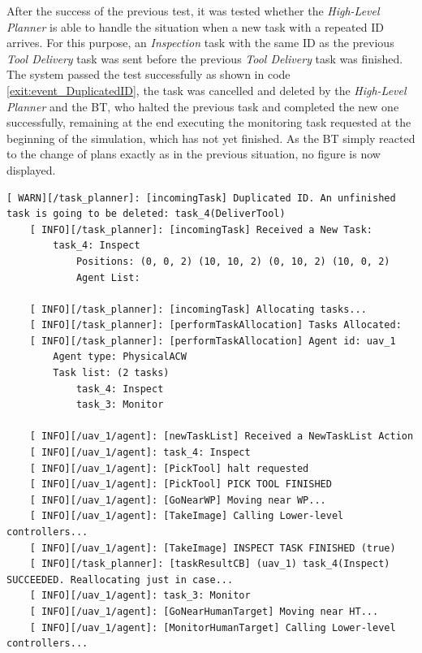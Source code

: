 After the success of the previous test, it was tested whether the \emph{High-Level Planner} is able to handle the situation when a new task with a repeated \gls{ID} arrives. For this purpose, an \emph{Inspection} task with the same \gls{ID} as the previous \emph{Tool Delivery} task was sent before the previous \emph{Tool Delivery} task was finished. The system passed the test successfully as shown in code \ref{exit:event_DuplicatedID}, the task was cancelled and deleted by the \emph{High-Level Planner} and the \gls{BT}, who halted the previous task and completed the new one successfully, remaining at the end executing the monitoring task requested at the beginning of the simulation, which has not yet finished. As the \gls{BT} simply reacted to the change of plans exactly as in the previous situation, no figure is now displayed.

\begin{lstlisting}[caption={Feedback messages printed after the arrival of a task with a repeated id. \emph{Inspection} task overwrites \emph{Tool Delivery} task}, breaklines=true, label=exit:event_DuplicatedID]
    [ WARN][/task_planner]: [incomingTask] Duplicated ID. An unfinished task is going to be deleted: task_4(DeliverTool)
    [ INFO][/task_planner]: [incomingTask] Received a New Task:
        task_4: Inspect
            Positions: (0, 0, 2) (10, 10, 2) (0, 10, 2) (10, 0, 2)
            Agent List:
    
    [ INFO][/task_planner]: [incomingTask] Allocating tasks...
    [ INFO][/task_planner]: [performTaskAllocation] Tasks Allocated:
    [ INFO][/task_planner]: [performTaskAllocation] Agent id: uav_1
        Agent type: PhysicalACW
        Task list: (2 tasks)
            task_4: Inspect
            task_3: Monitor
    
    [ INFO][/uav_1/agent]: [newTaskList] Received a NewTaskList Action
    [ INFO][/uav_1/agent]: task_4: Inspect
    [ INFO][/uav_1/agent]: [PickTool] halt requested
    [ INFO][/uav_1/agent]: [PickTool] PICK TOOL FINISHED
    [ INFO][/uav_1/agent]: [GoNearWP] Moving near WP...
    [ INFO][/uav_1/agent]: [TakeImage] Calling Lower-level controllers...
    [ INFO][/uav_1/agent]: [TakeImage] INSPECT TASK FINISHED (true)
    [ INFO][/task_planner]: [taskResultCB] (uav_1) task_4(Inspect) SUCCEEDED. Reallocating just in case...
    [ INFO][/uav_1/agent]: task_3: Monitor
    [ INFO][/uav_1/agent]: [GoNearHumanTarget] Moving near HT...
    [ INFO][/uav_1/agent]: [MonitorHumanTarget] Calling Lower-level controllers...
\end{lstlisting}

